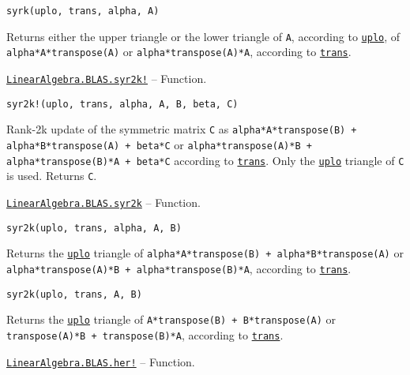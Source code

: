 \begin{adjustwidth}{2em}{0pt}


\begin{verbatim}
syrk(uplo, trans, alpha, A)
\end{verbatim}

Returns either the upper triangle or the lower triangle of \texttt{A}, according to \hyperlink{13880289478825450693}{\texttt{uplo}}, of \texttt{alpha*A*transpose(A)} or \texttt{alpha*transpose(A)*A}, according to \hyperlink{15951037910221396131}{\texttt{trans}}.



\end{adjustwidth}
\hypertarget{4077074915146270084}{}
\hyperlink{4077074915146270084}{\texttt{LinearAlgebra.BLAS.syr2k!}}  -- {Function.}

\begin{adjustwidth}{2em}{0pt}


\begin{verbatim}
syr2k!(uplo, trans, alpha, A, B, beta, C)
\end{verbatim}

Rank-2k update of the symmetric matrix \texttt{C} as \texttt{alpha*A*transpose(B) + alpha*B*transpose(A) + beta*C} or \texttt{alpha*transpose(A)*B + alpha*transpose(B)*A + beta*C} according to \hyperlink{15951037910221396131}{\texttt{trans}}. Only the \hyperlink{13880289478825450693}{\texttt{uplo}} triangle of \texttt{C} is used. Returns \texttt{C}.



\end{adjustwidth}
\hypertarget{8760875486589937064}{}
\hyperlink{8760875486589937064}{\texttt{LinearAlgebra.BLAS.syr2k}}  -- {Function.}

\begin{adjustwidth}{2em}{0pt}


\begin{verbatim}
syr2k(uplo, trans, alpha, A, B)
\end{verbatim}

Returns the \hyperlink{13880289478825450693}{\texttt{uplo}} triangle of \texttt{alpha*A*transpose(B) + alpha*B*transpose(A)} or \texttt{alpha*transpose(A)*B + alpha*transpose(B)*A}, according to \hyperlink{15951037910221396131}{\texttt{trans}}.




\begin{lstlisting}
syr2k(uplo, trans, A, B)
\end{lstlisting}

Returns the \hyperlink{13880289478825450693}{\texttt{uplo}} triangle of \texttt{A*transpose(B) + B*transpose(A)} or \texttt{transpose(A)*B + transpose(B)*A}, according to \hyperlink{15951037910221396131}{\texttt{trans}}.



\end{adjustwidth}
\hypertarget{13391948874280376128}{}
\hyperlink{13391948874280376128}{\texttt{LinearAlgebra.BLAS.her!}}  -- {Function.}

